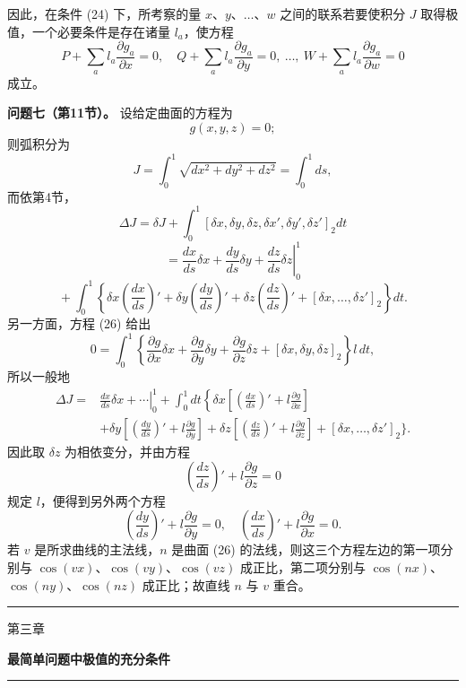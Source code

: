 \documentclass[11pt,a4paper,leqno]{article}
\begin{document}
因此，在条件 (24) 下，所考察的量 $x$、$y$、$\ldots$、$w$ 之间的联系若要使积分 $J$ 取得极值，一个必要条件是存在诸量 $l_a$，使方程
\[
P+\sum_a l_a\frac{\partial g_a}{\partial x}=0,\quad Q+\sum_a l_a\frac{\partial g_a}{\partial y}=0,\ \ldots,\ W+\sum_a l_a\frac{\partial g_a}{\partial w}=0
\]
成立。

\medskip
\noindent\textbf{问题七（第11节）。} 设给定曲面的方程为
\begin{equation}\tag{26}
g(x,y,z)=0;
\end{equation}
则弧积分为
\[
J=\int_0^1\sqrt{dx^2+dy^2+dz^2}=\int_0^1ds,
\]
而依第4节，
\[
\Delta J=\delta J+\int_0^1[\delta x,\delta y,\delta z,\delta x',\delta y',\delta z']_2dt
\]
\[
{}=\left.\frac{dx}{ds}\delta x+\frac{dy}{ds}\delta y+\frac{dz}{ds}\delta z\right|_0^1
\]
\[
{}+\int_0^1\left\{\delta x\left(\frac{dx}{ds}\right)'+\delta y\left(\frac{dy}{ds}\right)'+\delta z\left(\frac{dz}{ds}\right)'+[\delta x,\ldots,\delta z']_2\right\}dt.
\]
另一方面，方程 (26) 给出
\[
0=\int_0^1\left\{\frac{\partial g}{\partial x}\delta x+\frac{\partial g}{\partial y}\delta y+\frac{\partial g}{\partial z}\delta z+[\delta x,\delta y,\delta z]_2\right\}l\,dt,
\]
所以一般地
\[
\begin{split}
\Delta J={}&\left.\frac{dx}{ds}\delta x+\cdots\right|_0^1+\int_0^1dt\left\{\delta x\left[\left(\frac{dx}{ds}\right)'+l\frac{\partial g}{\partial x}\right]
\right.\\
&+\delta y\left[\left(\frac{dy}{ds}\right)'+l\frac{\partial g}{\partial y}\right]
+\delta z\left[\left(\frac{dz}{ds}\right)'+l\frac{\partial g}{\partial z}\right]
+[\delta x,\ldots,\delta z']_2\Bigg\}.
\end{split}
\]
因此取 $\delta z$ 为相依变分，并由方程
\[
\left(\frac{dz}{ds}\right)'+l\frac{\partial g}{\partial z}=0
\]
规定 $l$，便得到另外两个方程
\[
\left(\frac{dy}{ds}\right)'+l\frac{\partial g}{\partial y}=0,\quad
\left(\frac{dx}{ds}\right)'+l\frac{\partial g}{\partial x}=0.
\]
若 $v$ 是所求曲线的主法线，$n$ 是曲面 (26) 的法线，则这三个方程左边的第一项分别与 $\cos(vx)$、$\cos(vy)$、$\cos(vz)$ 成正比，第二项分别与 $\cos(nx)$、$\cos(ny)$、$\cos(nz)$ 成正比；故直线 $n$ 与 $v$ 重合。

\begin{center}\rule{38mm}{0.4pt}\end{center}

\clearpage

\begin{center}
{\large 第三章}\par
\vspace{0.8em}
{\Large\bfseries 最简单问题中极值的充分条件}\par
\vspace{1.0em}\rule{38mm}{0.4pt}
\end{center}
\end{document}
